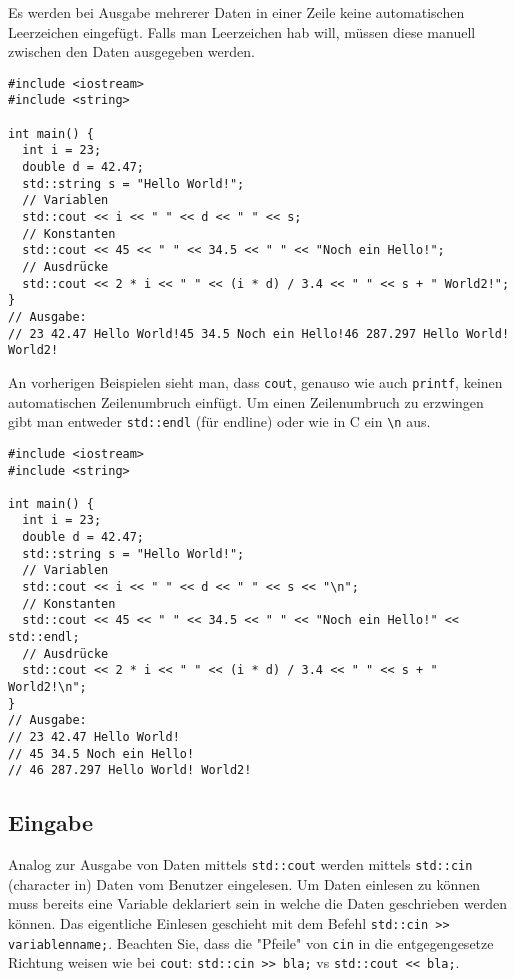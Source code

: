 \documentclass[11pt]{article}
\begin{document}
Es werden bei Ausgabe mehrerer Daten in einer Zeile keine
automatischen Leerzeichen eingefügt. Falls man Leerzeichen hab will,
müssen diese manuell zwischen den Daten ausgegeben werden.

\begin{verbatim}
#include <iostream>
#include <string>

int main() {
  int i = 23;
  double d = 42.47;
  std::string s = "Hello World!";
  // Variablen
  std::cout << i << " " << d << " " << s;
  // Konstanten
  std::cout << 45 << " " << 34.5 << " " << "Noch ein Hello!";
  // Ausdrücke
  std::cout << 2 * i << " " << (i * d) / 3.4 << " " << s + " World2!";
}
// Ausgabe:
// 23 42.47 Hello World!45 34.5 Noch ein Hello!46 287.297 Hello World! World2!
\end{verbatim}

An vorherigen Beispielen sieht man, dass \verb~cout~, genauso wie auch
\verb~printf~, keinen automatischen Zeilenumbruch einfügt. Um einen
Zeilenumbruch zu erzwingen gibt man entweder \verb~std::endl~ (für endline)
oder wie in C ein \verb~\n~ aus.

\begin{verbatim}
#include <iostream>
#include <string>

int main() {
  int i = 23;
  double d = 42.47;
  std::string s = "Hello World!";
  // Variablen
  std::cout << i << " " << d << " " << s << "\n";
  // Konstanten
  std::cout << 45 << " " << 34.5 << " " << "Noch ein Hello!" << std::endl;
  // Ausdrücke
  std::cout << 2 * i << " " << (i * d) / 3.4 << " " << s + " World2!\n";
}
// Ausgabe:
// 23 42.47 Hello World!
// 45 34.5 Noch ein Hello!
// 46 287.297 Hello World! World2!
\end{verbatim}
\subsection{Eingabe}
\label{sec-5-2}
Analog zur Ausgabe von Daten mittels \verb~std::cout~ werden mittels
\verb~std::cin~ (character in) Daten vom Benutzer eingelesen. Um Daten
einlesen zu können muss bereits eine Variable deklariert sein in
welche die Daten geschrieben werden können. Das eigentliche Einlesen
geschieht mit dem Befehl \verb~std::cin >> variablenname;~. Beachten Sie,
dass die "Pfeile" von \verb~cin~ in die entgegengesetze Richtung weisen wie
bei \verb~cout~: \verb~std::cin >> bla;~ vs \verb~std::cout << bla;~.
\end{document}
